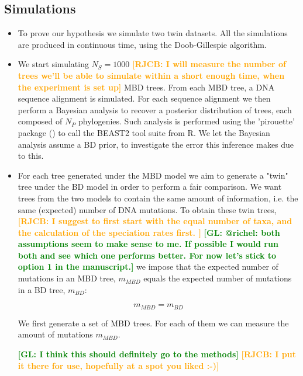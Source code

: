 \documentclass{article}
\newcommand*\richel[1]{\textcolor{orange}{\textbf{[RJCB: #1]}}}
\newcommand*\gio[1]{\textcolor{green}{\textbf{[GL: #1]}}}
\begin{document}
\subsection{Simulations}
\begin{itemize}

\item To prove our hypothesis we simulate two twin datasets. All the simulations are produced in continuous time, using the Doob-Gillespie algorithm. 

\item We start simulating $N_{S} = 1000$ \richel{I will measure the number of trees we'll be able to simulate within a short enough time, when the experiment is set up} MBD trees. From each MBD tree, a DNA sequence alignment is simulated. For each sequence alignment we then perform a Bayesian analysis to recover a posterior distribution of trees, each composed of $N_{P}$ phylogenies. Such analysis is performed using 
the 'pirouette' package (\cite{pirouette}) to call the BEAST2 tool 
suite from R. We let the Bayesian analysis assume a BD prior, to investigate
the error this inference makes due to this.

\item For each tree 
generated under the MBD model we aim to generate a "twin" tree under the BD model in order to perform a fair comparison. 
We want trees from the two models to contain the same amount of information, 
i.e. the same (expected) number of DNA mutations. %
To obtain these twin trees, 
\richel{
  I suggest to first start with the equal number of taxa,
  and the calculation of the speciation rates first.
}
\gio{@richel: both assumptions seem to make sense to me. If possible I would run both and see which one performs better. For now let's stick to option 1 in the manuscript.}
we impose
that the expected number of mutations in an MBD tree, $m_{MBD}$ equals
the expected number of mutations in a BD tree, $m_{BD}$:

\begin{equation}
m_{MBD} = m_{BD} \label{m equivalence}
\end{equation} 

We first generate a set of MBD trees. For each of them we can measure the amount of mutations $m_{MBD}$.

\gio{I think this should definitely go to the methods}
\richel{I put it there for use, hopefully at a spot you liked :-)}


\end{itemize}
\end{document}
